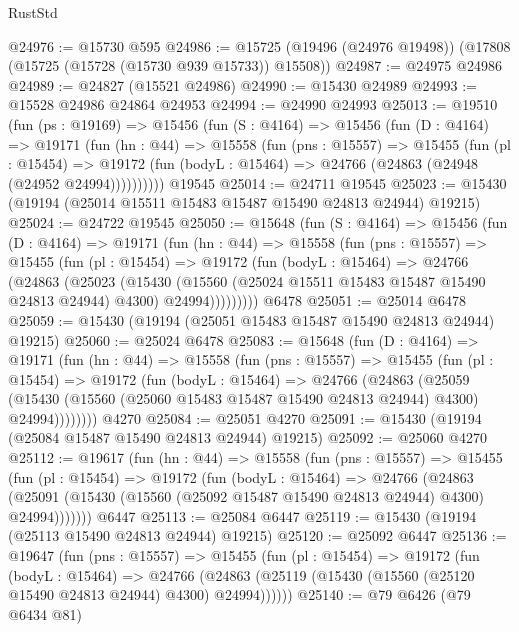 \begin{lexlean}{RustStd}
\begin{coremodule}
{\begin{coremodule}
{{{{{{{{{{{{{{{{{{{{{{{{{{{{{{{{{{{{{{{{{{{{{{{{{{{{{{{{{{{{@24976 := @15730 @595
@24986 := @15725 (@19496 (@24976 @19498)) (@17808 (@15725 (@15728 (@15730 @939 @15733)) @15508))
@24987 := @24975 @24986
@24989 := @24827 (@15521 @24986)
@24990 := @15430 @24989
@24993 := @15528 @24986 @24864 @24953
@24994 := @24990 @24993
@25013 := @19510
    (fun (ps : @19169) =>
    @15456
      (fun (S : @4164) =>
      @15456
        (fun (D : @4164) =>
        @19171
          (fun (hn : @44) =>
          @15558
            (fun (pns : @15557) =>
            @15455
              (fun (pl : @15454) =>
              @19172 (fun (bodyL : @15464) => @24766 (@24863 (@24948 (@24952 @24994))))))))))
    @19545
@25014 := @24711 @19545
@25023 := @15430 (@19194 (@25014 @15511 @15483 @15487 @15490 @24813 @24944) @19215)
@25024 := @24722 @19545
@25050 := @15648
    (fun (S : @4164) =>
    @15456
      (fun (D : @4164) =>
      @19171
        (fun (hn : @44) =>
        @15558
          (fun (pns : @15557) =>
          @15455
            (fun (pl : @15454) =>
            @19172
              (fun (bodyL : @15464) =>
              @24766
                (@24863
                  (@25023
                    (@15430
                      (@15560 (@25024 @15511 @15483 @15487 @15490 @24813 @24944) @4300)
                      @24994)))))))))
    @6478
@25051 := @25014 @6478
@25059 := @15430 (@19194 (@25051 @15483 @15487 @15490 @24813 @24944) @19215)
@25060 := @25024 @6478
@25083 := @15648
    (fun (D : @4164) =>
    @19171
      (fun (hn : @44) =>
      @15558
        (fun (pns : @15557) =>
        @15455
          (fun (pl : @15454) =>
          @19172
            (fun (bodyL : @15464) =>
            @24766
              (@24863
                (@25059
                  (@15430 (@15560 (@25060 @15483 @15487 @15490 @24813 @24944) @4300) @24994))))))))
    @4270
@25084 := @25051 @4270
@25091 := @15430 (@19194 (@25084 @15487 @15490 @24813 @24944) @19215)
@25092 := @25060 @4270
@25112 := @19617
    (fun (hn : @44) =>
    @15558
      (fun (pns : @15557) =>
      @15455
        (fun (pl : @15454) =>
        @19172
          (fun (bodyL : @15464) =>
          @24766
            (@24863
              (@25091 (@15430 (@15560 (@25092 @15487 @15490 @24813 @24944) @4300) @24994)))))))
    @6447
@25113 := @25084 @6447
@25119 := @15430 (@19194 (@25113 @15490 @24813 @24944) @19215)
@25120 := @25092 @6447
@25136 := @19647
    (fun (pns : @15557) =>
    @15455
      (fun (pl : @15454) =>
      @19172
        (fun (bodyL : @15464) =>
        @24766 (@24863 (@25119 (@15430 (@15560 (@25120 @15490 @24813 @24944) @4300) @24994))))))
@25140 := @79 @6426 (@79 @6434 @81)
}}}}}}}}}}}}}}}}}}}}}}}}}}}}}}}}}}}}}}}}}}}}}}}}}}}}}}}}}}}}
\end{coremodule}}
\end{coremodule}
\end{lexlean}
